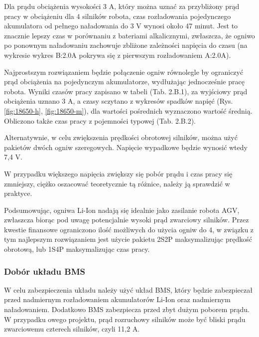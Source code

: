\documentclass{report}
\begin{document}
\begin{enumerate}[label=(\Alph*)]
    Dla prądu obciążenia wysokości 3 A, który można uznać za przybliżony prąd pracy w obciążeniu dla 4 silników robota, czas rozładowania pojedynczego akumulatora od pełnego naładowania do 3 V wynosi około 47 minut. Jest to znacznie lepszy czas w porównaniu z bateriami alkalicznymi, zwłaszcza, że ogniwo po ponownym naładowaniu zachowuje zbliżone zależności napięcia do czasu (na wykresie wykres B:2.0A pokrywa się z pierwszym rozładowaniem A:2.0A).
    
     Najprostszym rozwiązaniem będzie połączenie ogniw równolegle by ograniczyć prąd obciążenia na pojedynczym akumulatorze, wydłużając jednocześnie pracę robota. Wyniki czasów pracy zapisano w tabeli (Tab. 2.B.1), za wyjściowy prąd obciążenia uznano 3 A, a czasy sczytano z wykresów spadków napięć (Rys. \ref{fig:18650-h}, \ref{fig:18650-m}), dla wartości pośrednich wyznaczono wartość średnią. Obliczono także czas pracy z pojemności typowej (Tab. 2.B.2).
     

    Alternatywnie, w celu zwiększenia prędkości obrotowej silników, można użyć pakietów dwóch ogniw szeregowych. Napięcie wypadkowe będzie wynosić wtedy 7,4 V.
    
    W przypadku większego napięcia zwiększy się pobór prądu i czas pracy się zmniejszy, ciężko oszacować teoretycznie tą różnice, należy ją sprawdzić w praktyce.
    
    Podsumowując, ogniwa Li-Ion nadają się idealnie jako zasilanie robota AGV, zwłaszcza biorąc pod uwagę potencjalnie wysoki prąd zwarciowy silników. Przez kwestie finansowe ograniczono ilość możliwych do użycia ogniw do 4, w związku z tym najlepszym rozwiązaniem jest użycie pakietu 2S2P maksymalizując prędkość obrotową, lub 1S4P maksymalizując czas pracy.
\end{enumerate}

\subsubsection{Dobór układu BMS}

W celu zabezpieczenia układu należy użyć układ BMS, który będzie zabezpieczał przed nadmiernym rozładowaniem akumulatorów Li-Ion oraz nadmiernym naładowaniem. Dodatkowo BMS zabezpiecza przed zbyt dużym poborem prądu. W przypadku owego projektu, prąd rozruchowy silników może być bliski prądu zwarciowemu czterech silników, czyli 11,2 A.
\end{document}
